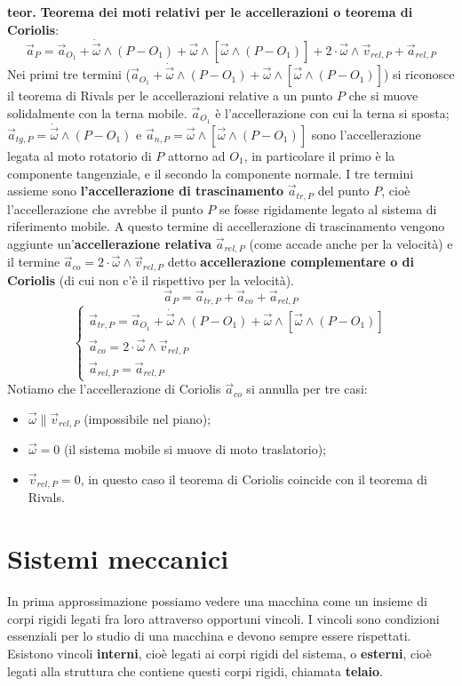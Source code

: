 \textbf{teor.} \textbf{Teorema dei moti relativi per le accellerazioni o teorema di Coriolis}:
\[
    \vec{a}_P = \vec{a}_{O_1} + \dot{\vec{\omega}} \land (P-O_1) + \vec{\omega} \land [\vec{\omega}\land (P-O_1)] + 2 \cdot \vec{\omega}\land \vec{v}_{rel,P} + \vec{a}_{rel,P}
\]
Nei primi tre termini ($\vec{a}_{O_1} + \dot{\vec{\omega}} \land (P-O_1) + \vec{\omega} \land [\vec{\omega}\land (P-O_1)]$) si riconosce il teorema di Rivals per le accellerazioni relative a un punto $P$ che si muove solidalmente con la terna mobile. $\vec{a}_{O_1}$ è l'accellerazione con cui la terna si sposta; $\vec{a}_{tg,P} = \dot{\vec{\omega}} \land (P-O_1)$ e $\vec{a}_{n,P} = \vec{\omega} \land [\vec{\omega}\land (P-O_1)]$ sono l'accellerazione legata al moto rotatorio di $P$ attorno ad $O_1$, in particolare il primo è la componente tangenziale, e il secondo la componente normale. I tre termini assieme sono \textbf{l'accellerazione di trascinamento} $\vec{a}_{tr,P}$ del punto $P$, cioè l'accellerazione che avrebbe il punto $P$ se fosse rigidamente legato al sistema di riferimento mobile.\newline
A questo termine di accellerazione di trascinamento vengono aggiunte un'\textbf{accellerazione relativa} $\vec{a}_{rel,P}$ (come accade anche per la velocità) e il termine $\vec{a}_{co} = 2 \cdot \vec{\omega}\land \vec{v}_{rel,P}$ detto \textbf{accellerazione complementare o di Coriolis} (di cui non c'è il rispettivo per la velocità).
\[
    \vec{a}_P = \vec{a}_{tr,P} + \vec{a}_{co} + \vec{a}_{rel,P}
\]
\[
    \begin{cases}
        \vec{a}_{tr,P} = \vec{a}_{O_1} + \dot{\vec{\omega}} \land (P-O_1) + \vec{\omega} \land [\vec{\omega}\land (P-O_1)]\\
        \vec{a}_{co} = 2 \cdot \vec{\omega}\land \vec{v}_{rel,P}\\
        \vec{a}_{rel,P} = \vec{a}_{rel,P}
    \end{cases}
\]
Notiamo che l'accellerazione di Coriolis $\vec{a}_{co}$ si annulla per tre casi: 
\begin{itemize}
    \item $\vec{\omega} \parallel \vec{v}_{rel,P}$ (impossibile nel piano);
    \item $\vec{\omega} = 0$ (il sistema mobile si muove di moto traslatorio);
    \item $\vec{v}_{rel,P} = 0$, in questo caso il teorema di Coriolis coincide con il teorema di Rivals.
\end{itemize}
\newpage
\section{Sistemi meccanici}
In prima approssimazione possiamo vedere una macchina come un insieme di corpi rigidi legati fra loro attraverso opportuni vincoli. I vincoli sono condizioni essenziali per lo studio di una macchina e devono sempre essere rispettati.\newline
Esistono vincoli \textbf{interni}, cioè legati ai corpi rigidi del sistema, o \textbf{esterni}, cioè legati alla struttura che contiene questi corpi rigidi, chiamata \textbf{telaio}.
